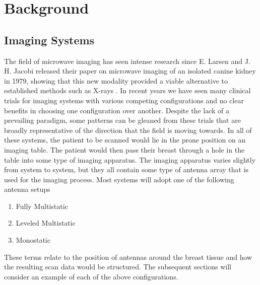\chapter*{Background}
\section{Imaging Systems}
The field of microwave imaging has seen intense research since E.
Larsen and J. H. Jacobi released their paper on microwave imaging of an isolated canine kidney in 1979, showing that this new
modality provided a viable alternative to established methods such as X-rays
\cite{larsenMicrowaveScatteringParameter1979}. In recent years we have seen many clinical trials for imaging systems
with various competing configurations and no clear benefits in choosing one configuration over another. Despite the lack
of a prevailing paradigm, some patterns can be gleaned from these trials that are broadly representative of the
direction that the field is moving towards. In all of these systems, the patient to be scanned would lie in the prone
position on an imaging table. The patient would then pass their breast through a hole in the table into some type of
imaging apparatus. The imaging apparatus varies slightly from system to system, but they all contain some type of
antenna array that is used for the imaging process. Most systems will adopt one of the following antenna setups
\begin{enumerate}
    \item Fully Multistatic
    \item Leveled Multistatic
    \item Monostatic
\end{enumerate}
\noindent These terms relate to the position of antennas around the breast tissue and how the resulting scan data would
be structured. The subsequent sections will consider an example of each of the above configurations. \hfill \break

